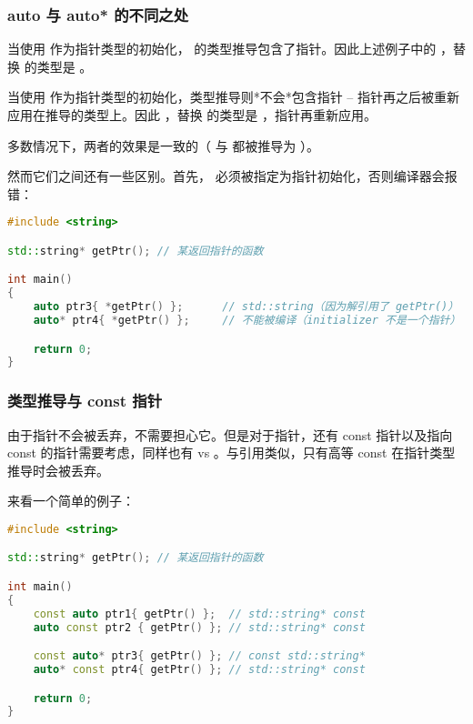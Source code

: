 \documentclass[../../LearnCpp.tex]{subfiles}
\begin{document}
\subsubsection*{auto 与 auto* 的不同之处}

当使用  作为指针类型的初始化， 的类型推导包含了指针。因此上述例子中的 ，替换  的类型是 。

当使用  作为指针类型的初始化，类型推导则*不会*包含指针 -- 指针再之后被重新应用在推导的类型上。因此 ，替换  的类型是 ，指针再重新应用。

多数情况下，两者的效果是一致的（ 与  都被推导为 ）。

然而它们之间还有一些区别。首先， 必须被指定为指针初始化，否则编译器会报错：

\begin{lstlisting}[language=C++]
#include <string>

std::string* getPtr(); // 某返回指针的函数

int main()
{
    auto ptr3{ *getPtr() };      // std::string（因为解引用了 getPtr()）
    auto* ptr4{ *getPtr() };     // 不能被编译（initializer 不是一个指针）

    return 0;
}
\end{lstlisting}

\subsubsection*{类型推导与 const 指针}

由于指针不会被丢弃，不需要担心它。但是对于指针，还有 const 指针以及指向 const 的指针需要考虑，同样也有  vs 。与引用类似，只有高等 const 在指针类型推导时会被丢弃。

来看一个简单的例子：

\begin{lstlisting}[language=C++]
#include <string>

std::string* getPtr(); // 某返回指针的函数

int main()
{
    const auto ptr1{ getPtr() };  // std::string* const
    auto const ptr2 { getPtr() }; // std::string* const

    const auto* ptr3{ getPtr() }; // const std::string*
    auto* const ptr4{ getPtr() }; // std::string* const

    return 0;
}
\end{lstlisting}
\end{document}
